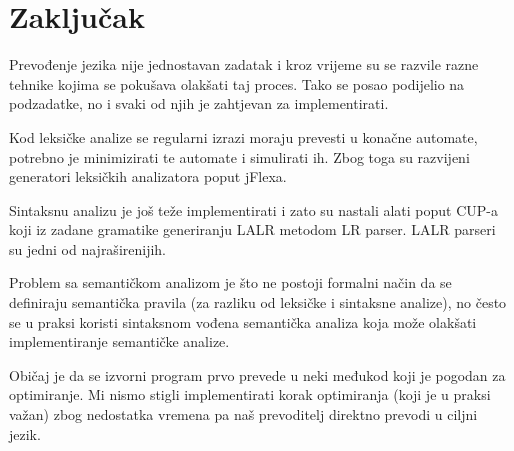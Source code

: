 \chapter{Zaključak}

Prevođenje jezika nije jednostavan zadatak i kroz vrijeme su se razvile razne tehnike kojima se pokušava
olakšati taj proces. Tako se posao podijelio na podzadatke, no i svaki od njih je zahtjevan za implementirati.

Kod leksičke analize se regularni izrazi moraju prevesti u konačne automate, potrebno je minimizirati 
te automate i simulirati ih. Zbog toga su razvijeni generatori leksičkih analizatora poput jFlexa.

Sintaksnu analizu je još teže implementirati i zato su nastali alati poput CUP-a koji
iz zadane gramatike generiranju LALR metodom LR parser. LALR parseri su jedni od najraširenijih.

Problem sa semantičkom analizom je što ne postoji formalni način da se definiraju semantička 
pravila (za razliku od leksičke i sintaksne analize), no često se u praksi koristi
sintaksnom vođena semantička analiza koja može olakšati implementiranje semantičke analize.

Običaj je da se izvorni program prvo prevede u neki međukod koji je pogodan za optimiranje.
Mi nismo stigli implementirati korak optimiranja (koji je u praksi važan) zbog nedostatka
vremena pa naš prevoditelj direktno prevodi u ciljni jezik.
